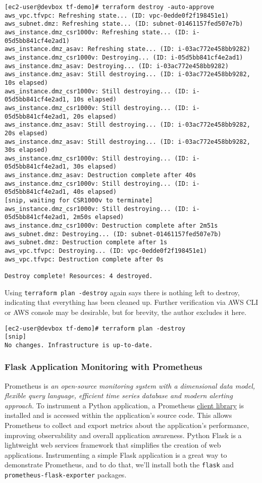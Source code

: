 \begin{verbatim}
[ec2-user@devbox tf-demo]# terraform destroy -auto-approve
aws_vpc.tfvpc: Refreshing state... (ID: vpc-0edde0f2f198451e1)
aws_subnet.dmz: Refreshing state... (ID: subnet-01461157fed507e7b)
aws_instance.dmz_csr1000v: Refreshing state... (ID: i-05d5bb841cf4e2ad1)
aws_instance.dmz_asav: Refreshing state... (ID: i-03ac772e458bb9282)
aws_instance.dmz_csr1000v: Destroying... (ID: i-05d5bb841cf4e2ad1)
aws_instance.dmz_asav: Destroying... (ID: i-03ac772e458bb9282)
aws_instance.dmz_asav: Still destroying... (ID: i-03ac772e458bb9282, 10s elapsed)
aws_instance.dmz_csr1000v: Still destroying... (ID: i-05d5bb841cf4e2ad1, 10s elapsed)
aws_instance.dmz_csr1000v: Still destroying... (ID: i-05d5bb841cf4e2ad1, 20s elapsed)
aws_instance.dmz_asav: Still destroying... (ID: i-03ac772e458bb9282, 20s elapsed)
aws_instance.dmz_asav: Still destroying... (ID: i-03ac772e458bb9282, 30s elapsed)
aws_instance.dmz_csr1000v: Still destroying... (ID: i-05d5bb841cf4e2ad1, 30s elapsed)
aws_instance.dmz_asav: Destruction complete after 40s
aws_instance.dmz_csr1000v: Still destroying... (ID: i-05d5bb841cf4e2ad1, 40s elapsed)
[snip, waiting for CSR1000v to terminate]
aws_instance.dmz_csr1000v: Still destroying... (ID: i-05d5bb841cf4e2ad1, 2m50s elapsed)
aws_instance.dmz_csr1000v: Destruction complete after 2m51s
aws_subnet.dmz: Destroying... (ID: subnet-01461157fed507e7b)
aws_subnet.dmz: Destruction complete after 1s
aws_vpc.tfvpc: Destroying... (ID: vpc-0edde0f2f198451e1)
aws_vpc.tfvpc: Destruction complete after 0s

Destroy complete! Resources: 4 destroyed.
\end{verbatim}

Using \verb|terraform plan -destroy| again says there is nothing left to destroy,
indicating that everything has been cleaned up. Further verification via AWS
CLI or AWS console may be desirable, but for brevity, the author excludes it here.

\begin{verbatim}
[ec2-user@devbox tf-demo]# terraform plan -destroy
[snip]
No changes. Infrastructure is up-to-date.
\end{verbatim}

\subsubsection{Flask Application Monitoring with Prometheus}
Prometheus is \textit{an open-source monitoring system with a dimensional
data model, flexible query language, efficient time series database and modern
alerting approach.} To instrument a Python application, a Prometheus 
\href{https://prometheus.io/docs/instrumenting/clientlibs/}{client library}
is installed and is accessed within the application's source code. This allows
Prometheus to collect and export metrics about the application's performance,
improving observability and overall application awareness. Python Flask is
a lightweight web services framework that simplifies the creation of web
applications. Instrumenting a simple Flask application is a great way
to demonstrate Prometheus, and to do that, we'll install both the
\verb|flask| and \verb|prometheus-flask-exporter| packages.

